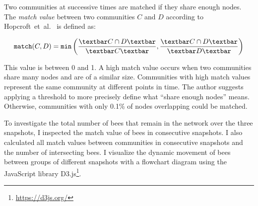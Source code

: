 Two communities at successive times are matched if they share enough nodes.
The \emph{match value} between two communities $C$ and $D$ according to Hopcroft~et~al.~\cite{hopcroft2004tracking} is defined as:

\begin{equation}
\label{eq:match}
\texttt{match}(C,D) = \texttt{min}\left( \frac{\textbar C\cap D \textbar}{\textbar C\textbar }, \frac{\textbar C\cap D \textbar}{\textbar D \textbar }\right)
\end{equation}

This value is between 0 and 1.
A high match value occurs when two communities share many nodes and are of a similar size.
Communities with high match values represent the same community at different points in time.
The author suggests applying a threshold to more precisely define what ``share enough nodes'' means.
Otherwise, communities with only 0.1\% of nodes overlapping could be matched.

To investigate the total number of bees that remain in the network over the three snapshots, I inspected the match value of bees in consecutive snapshots.
I also calculated all match values between communities in consecutive snapshots and  the number of intersecting bees. I visualize the dynamic movement
of bees between groups of different snapshots with a flowchart diagram using the JavaScript library D3.js\footnote{\url{https://d3js.org/}}.